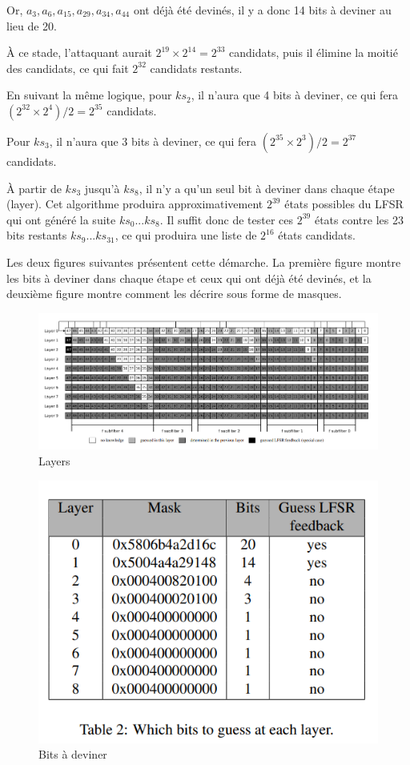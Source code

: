 \documentclass{template}
\begin{document}
Or, $a_3, a_6, a_{15}, a_{29}, a_{34}, a_{44}$ ont déjà été devinés, il y a donc 14 bits à deviner au lieu de 20.

À ce stade, l'attaquant aurait $2^{19} \times 2^{14} = 2^{33}$ candidats, puis il élimine la moitié des candidats, ce qui fait $2^{32}$ candidats restants.

En suivant la même logique, pour $ks_2$, il n'aura que 4 bits à deviner, ce qui fera $(2^{32} \times 2^4)/2 = 2^{35}$ candidats.

Pour $ks_3$, il n'aura que 3 bits à deviner, ce qui fera $(2^{35} \times 2^3)/2 = 2^{37}$ candidats.

À partir de $ks_3$ jusqu'à $ks_8$, il n'y a qu'un seul bit à deviner dans chaque étape (layer). Cet algorithme produira approximativement $2^{39}$ états possibles du LFSR qui ont généré la suite $ks_0...ks_8$. Il suffit donc de tester ces $2^{39}$ états contre les 23 bits restants $ks_9...ks_{31}$, ce qui produira une liste de $2^{16}$ états candidats.

Les deux figures suivantes présentent cette démarche. La première figure montre les bits à deviner dans chaque étape et ceux qui ont déjà été devinés, et la deuxième figure montre comment les décrire sous forme de masques.

\begin{figure}
    \centering
    \includegraphics[width=\textwidth]{Layers.png}
    \caption{Layers}
    \label{fig:image}
\end{figure}

\begin{figure}
    \centering
    \includegraphics[scale=0.7]{mask.png}
    \caption{Bits à deviner}
    \label{fig:image}
\end{figure}
\end{document}
